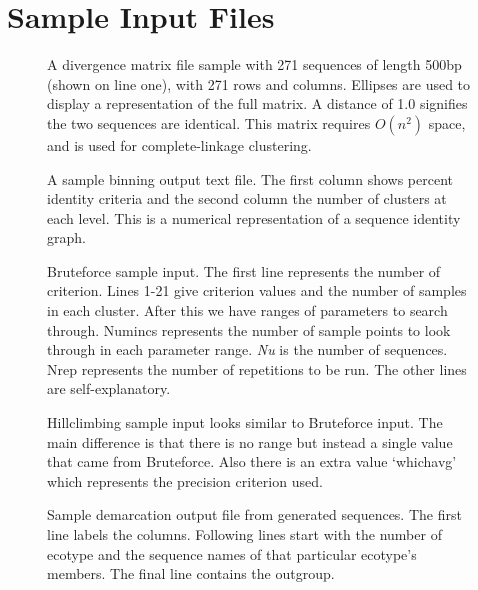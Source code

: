 \chapter{Sample Input Files}

\begin{figure}[h!]
\centering
\noindent{}
\caption[Divergence matrix sample text file.]{A divergence matrix file sample with 271 sequences of length 500bp (shown on line one), with 271 rows and columns. Ellipses are used to display a representation of the full matrix. A distance of 1.0 signifies the two sequences are identical. This matrix requires $O(n^2)$ space, and is used for complete-linkage clustering.}
\label{code:DivergenceMatrix}
\end{figure}

\begin{figure}[h!]
\centering
\noindent{}
\caption[Binning sample output.]{A sample binning output text file. The first column shows percent identity criteria and the second column the number of clusters at each level. This is a numerical representation of a sequence identity graph.}
\label{code:Binning}
\end{figure}

\begin{figure}[h!]
\centering
\noindent{}
\caption[Bruteforce sample input.]{Bruteforce sample input.
The first line represents the number of criterion.
Lines 1-21 give criterion values and the number of samples in each cluster.
After this we have ranges of parameters to search through.
Numincs represents the number of sample points to look through in each parameter range.
\emph{Nu} is the number of sequences.
Nrep represents the number of repetitions to be run. 
The other lines are self-explanatory.}
\label{code:Bruteforce}
\end{figure}

\begin{figure}[h!]
\centering
\noindent{}
\caption[Hillclimbing sample input.]{Hillclimbing sample input looks similar to Bruteforce input. The main difference is that there is no range but instead a single value that came from Bruteforce. Also there is an extra value `whichavg' which represents the precision criterion used.}
\label{code:Hillclimbing}
\end{figure}

\begin{figure}[h!]
\centering
\noindent{}
\caption[Sample demarcation output file from generated sequences.]{Sample demarcation output file from generated sequences.
The first line labels the columns.
Following lines start with the number of ecotype and the sequence names of that particular ecotype's members.
The final line contains the outgroup.}
\label{code:DemarcationFormat}
\end{figure}

